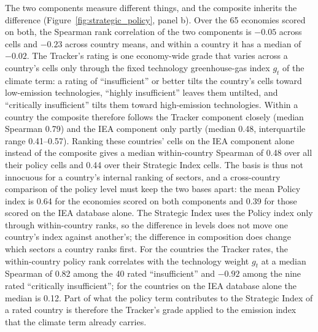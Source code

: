 The two components measure different things, and the composite inherits the difference
(Figure~\ref{fig:strategic_policy}, panel b). Over the 65 economies scored on both, the Spearman
rank correlation of the two components is $-0.05$ across cells and $-0.23$ across country means,
and within a country it has a median of $-0.02$. The Tracker's rating is one economy-wide grade
that varies across a country's cells only through the fixed technology greenhouse-gas index $g_t$
of the climate term: a rating of ``insufficient'' or better tilts the country's cells toward
low-emission technologies, ``highly insufficient'' leaves them untilted, and ``critically
insufficient'' tilts them toward high-emission technologies. Within a country the composite
therefore follows the Tracker component closely (median Spearman 0.79) and the IEA component only
partly (median 0.48, interquartile range 0.41--0.57). Ranking these countries' cells on the IEA
component alone instead of the composite gives a median within-country Spearman of 0.48 over all
their policy cells and 0.44 over their Strategic Index cells. The basis is thus not innocuous for a
country's internal ranking of sectors, and a cross-country comparison of the policy level must keep
the two bases apart: the mean Policy index is 0.64 for the economies scored on both components and
0.39 for those scored on the IEA database alone. The Strategic Index uses the Policy index only
through within-country ranks, so the difference in levels does not move one country's index
against another's; the difference in composition does change which sectors a country ranks first.
For the countries the Tracker rates, the within-country policy rank correlates with the technology
weight $g_t$ at a median Spearman of 0.82 among the 40 rated ``insufficient'' and $-0.92$ among the
nine rated ``critically insufficient''; for the countries on the IEA database alone the median is
0.12. Part of what the policy term contributes to the Strategic Index of a rated country is
therefore the Tracker's grade applied to the emission index that the climate term already carries.

